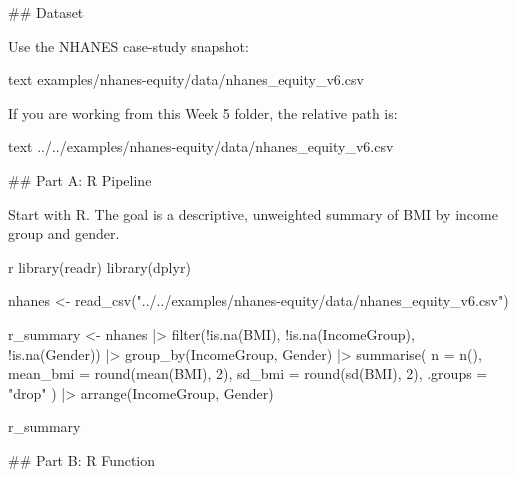 \documentclass[
  letterpaper,
  DIV=11,
  numbers=noendperiod,
  oneside]{scrreprt}
\newenvironment{Shaded}{\begin{snugshade}}{\end{snugshade}}
\newcommand{\AttributeTok}[1]{\textcolor[rgb]{0.40,0.45,0.13}{#1}}
\newcommand{\DecValTok}[1]{\textcolor[rgb]{0.68,0.00,0.00}{#1}}
\newcommand{\FunctionTok}[1]{\textcolor[rgb]{0.28,0.35,0.67}{#1}}
\newcommand{\InformationTok}[1]{\textcolor[rgb]{0.37,0.37,0.37}{#1}}
\newcommand{\NormalTok}[1]{\textcolor[rgb]{0.00,0.23,0.31}{#1}}
\newcommand{\OtherTok}[1]{\textcolor[rgb]{0.00,0.23,0.31}{#1}}
\newcommand{\SpecialCharTok}[1]{\textcolor[rgb]{0.37,0.37,0.37}{#1}}
\newcommand{\StringTok}[1]{\textcolor[rgb]{0.13,0.47,0.30}{#1}}
\begin{document}
\begin{Shaded}
\begin{Highlighting}[numbers=left,,]
\FunctionTok{\#\# Dataset}

\NormalTok{Use the NHANES case{-}study snapshot:}

\InformationTok{\textasciigrave{}\textasciigrave{}\textasciigrave{}text}
\InformationTok{examples/nhanes{-}equity/data/nhanes\_equity\_v6.csv}
\InformationTok{\textasciigrave{}\textasciigrave{}\textasciigrave{}}

\NormalTok{If you are working from this Week 5 folder, the relative path is:}

\InformationTok{\textasciigrave{}\textasciigrave{}\textasciigrave{}text}
\InformationTok{../../examples/nhanes{-}equity/data/nhanes\_equity\_v6.csv}
\InformationTok{\textasciigrave{}\textasciigrave{}\textasciigrave{}}

\FunctionTok{\#\# Part A: R Pipeline}

\NormalTok{Start with R. The goal is a descriptive, unweighted summary of BMI by income group and gender.}

\InformationTok{\textasciigrave{}\textasciigrave{}\textasciigrave{}r}
\FunctionTok{library}\NormalTok{(readr)}
\FunctionTok{library}\NormalTok{(dplyr)}

\NormalTok{nhanes }\OtherTok{\textless{}{-}} \FunctionTok{read\_csv}\NormalTok{(}\StringTok{"../../examples/nhanes{-}equity/data/nhanes\_equity\_v6.csv"}\NormalTok{)}

\NormalTok{r\_summary }\OtherTok{\textless{}{-}}\NormalTok{ nhanes }\SpecialCharTok{|\textgreater{}}
  \FunctionTok{filter}\NormalTok{(}\SpecialCharTok{!}\FunctionTok{is.na}\NormalTok{(BMI), }\SpecialCharTok{!}\FunctionTok{is.na}\NormalTok{(IncomeGroup), }\SpecialCharTok{!}\FunctionTok{is.na}\NormalTok{(Gender)) }\SpecialCharTok{|\textgreater{}}
  \FunctionTok{group\_by}\NormalTok{(IncomeGroup, Gender) }\SpecialCharTok{|\textgreater{}}
  \FunctionTok{summarise}\NormalTok{(}
    \AttributeTok{n =} \FunctionTok{n}\NormalTok{(),}
    \AttributeTok{mean\_bmi =} \FunctionTok{round}\NormalTok{(}\FunctionTok{mean}\NormalTok{(BMI), }\DecValTok{2}\NormalTok{),}
    \AttributeTok{sd\_bmi =} \FunctionTok{round}\NormalTok{(}\FunctionTok{sd}\NormalTok{(BMI), }\DecValTok{2}\NormalTok{),}
    \AttributeTok{.groups =} \StringTok{"drop"}
\NormalTok{  ) }\SpecialCharTok{|\textgreater{}}
  \FunctionTok{arrange}\NormalTok{(IncomeGroup, Gender)}

\NormalTok{r\_summary}
\InformationTok{\textasciigrave{}\textasciigrave{}\textasciigrave{}}

\FunctionTok{\#\# Part B: R Function}


\end{Highlighting}
\end{Shaded}
\end{document}
